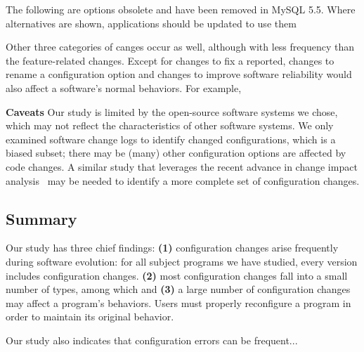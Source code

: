 The following are options obsolete and have been removed in
MySQL 5.5. Where alternatives are shown, applications should
be updated to use them

Other three categories of canges occur as well, although
with less frequency than the feature-related changes.
Except for changes to fix a reported, changes to rename
a configuration option and changes to improve
software reliability would also affect a
software's normal behaviors. For example,




\vspace{1mm}
\noindent\textbf{Caveats}
Our study is limited by the open-source
software systems we chose, which may not reflect
the characteristics of other software systems.
We only examined software change logs to identify
changed configurations, which is a biased
subset; there may be (many) other configuration
options are affected by code changes. A similar
study that leverages the recent advance in
change impact analysis~\cite{} may be needed
to identify a more complete set of
configuration changes.


\subsection{Summary}

Our study has three chief findings:
\textbf{(1)} configuration
changes arise frequently during software evolution: for
all subject programs we have studied, every version
includes configuration changes. \textbf{(2)} most configuration
changes fall into a small number of types, among
which 
and \textbf{(3)} a large number of
configuration changes may affect a program's
behaviors. Users must properly reconfigure a
program in order to maintain its original behavior.

Our study also indicates that configuration errors
can be frequent... 
